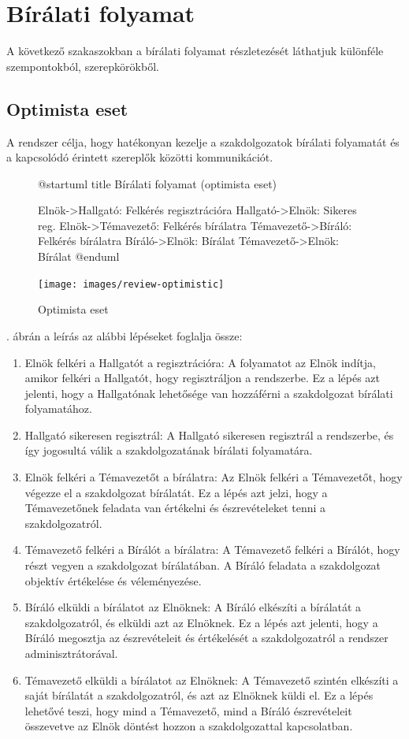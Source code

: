 \documentclass[a4paper,12pt]{article}
\begin{document}
\section{Bírálati folyamat}

A következő szakaszokban a bírálati folyamat részletezését láthatjuk különféle szempontokból, szerepkörökből.

\subsection{Optimista eset}

A rendszer célja, hogy hatékonyan kezelje a szakdolgozatok bírálati folyamatát és a kapcsolódó érintett szereplők közötti kommunikációt. 

\begin{figure}[h!]
\centering
\begin{plantuml}
@startuml
title Bírálati folyamat (optimista eset)

Elnök->Hallgató: Felkérés regisztrációra
Hallgató->Elnök: Sikeres reg.
Elnök->Témavezető: Felkérés bírálatra
Témavezető->Bíráló: Felkérés bírálatra
Bíráló->Elnök: Bírálat
Témavezető->Elnök: Bírálat
@enduml
\end{plantuml}
\texttt{[image: images/review-optimistic]}
\caption{Optimista eset}
\label{fig:review-optimistic}
\end{figure}

. ábrán a leírás az alábbi lépéseket foglalja össze:
\begin{enumerate}
\item Elnök felkéri a Hallgatót a regisztrációra: A folyamatot az Elnök indítja, amikor felkéri a Hallgatót, hogy regisztráljon a rendszerbe. Ez a lépés azt jelenti, hogy a Hallgatónak lehetősége van hozzáférni a szakdolgozat bírálati folyamatához.
\item Hallgató sikeresen regisztrál: A Hallgató sikeresen regisztrál a rendszerbe, és így jogosultá válik a szakdolgozatának bírálati folyamatára.
\item Elnök felkéri a Témavezetőt a bírálatra: Az Elnök felkéri a Témavezetőt, hogy végezze el a szakdolgozat bírálatát. Ez a lépés azt jelzi, hogy a Témavezetőnek feladata van értékelni és észrevételeket tenni a szakdolgozatról.
\item Témavezető felkéri a Bírálót a bírálatra: A Témavezető felkéri a Bírálót, hogy részt vegyen a szakdolgozat bírálatában. A Bíráló feladata a szakdolgozat objektív értékelése és véleményezése.
\item Bíráló elküldi a bírálatot az Elnöknek: A Bíráló elkészíti a bírálatát a szakdolgozatról, és elküldi azt az Elnöknek. Ez a lépés azt jelenti, hogy a Bíráló megosztja az észrevételeit és értékelését a szakdolgozatról a rendszer adminisztrátorával.
\item Témavezető elküldi a bírálatot az Elnöknek: A Témavezető szintén elkészíti a saját bírálatát a szakdolgozatról, és azt az Elnöknek küldi el. Ez a lépés lehetővé teszi, hogy mind a Témavezető, mind a Bíráló észrevételeit összevetve az Elnök döntést hozzon a szakdolgozattal kapcsolatban.
\end{enumerate}
\end{document}
